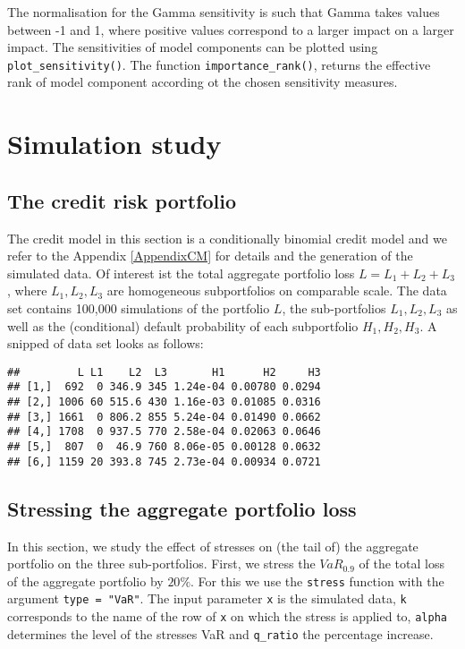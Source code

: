 \documentclass[]{article}
\begin{document}
The normalisation for the Gamma sensitivity is such that Gamma takes values between -1 and 1, where positive values correspond to a larger impact on a larger impact. The sensitivities of model components can be plotted using \texttt{plot\_sensitivity()}. The function \texttt{importance\_rank()}, returns the effective rank of model component according ot the chosen sensitivity measures.

\hypertarget{Sec:CreditModel}{%
\section{Simulation study}\label{Sec:CreditModel}}

\hypertarget{the-credit-risk-portfolio}{%
\subsection{The credit risk portfolio}\label{the-credit-risk-portfolio}}

The credit model in this section is a conditionally binomial credit model and we refer to the Appendix \ref{AppendixCM} for details and the generation of the simulated data. Of interest ist the total aggregate portfolio loss \(L = L_1 + L_2 + L_3\), where \(L_1, L_2, L_3\) are homogeneous subportfolios on comparable scale. The data set contains 100,000 simulations of the portfolio \(L\), the sub-portfolios \(L_1, L_2, L_3\) as well as the (conditional) default probability of each subportfolio \(H_1, H_2, H_3\). A snipped of data set looks as follows:

\begin{verbatim}
##         L L1    L2  L3       H1      H2     H3
## [1,]  692  0 346.9 345 1.24e-04 0.00780 0.0294
## [2,] 1006 60 515.6 430 1.16e-03 0.01085 0.0316
## [3,] 1661  0 806.2 855 5.24e-04 0.01490 0.0662
## [4,] 1708  0 937.5 770 2.58e-04 0.02063 0.0646
## [5,]  807  0  46.9 760 8.06e-05 0.00128 0.0632
## [6,] 1159 20 393.8 745 2.73e-04 0.00934 0.0721
\end{verbatim}

\hypertarget{stressing-the-aggregate-portfolio-loss}{%
\subsection{Stressing the aggregate portfolio loss}\label{stressing-the-aggregate-portfolio-loss}}

In this section, we study the effect of stresses on (the tail of) the aggregate portfolio on the three sub-portfolios. First, we stress the \(VaR_{0.9}\) of the total loss of the aggregate portfolio by \(20\%\). For this we use the \texttt{stress} function with the argument \texttt{type\ =\ "VaR"}. The input parameter \texttt{x} is the simulated data, \texttt{k} corresponds to the name of the row of \texttt{x} on which the stress is applied to, \texttt{alpha} determines the level of the stresses VaR and \texttt{q\_ratio} the percentage increase.
\end{document}

